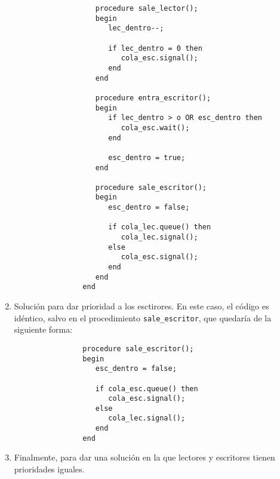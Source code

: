 \begin{ejercicio}
\begin{enumerate}
\begin{verbatim}
                   procedure sale_lector();
                   begin
                      lec_dentro--;

                      if lec_dentro = 0 then
                         cola_esc.signal();
                      end
                   end

                   procedure entra_escritor();
                   begin
                      if lec_dentro > o OR esc_dentro then
                         cola_esc.wait();
                      end

                      esc_dentro = true;
                   end

                   procedure sale_escritor();
                   begin
                      esc_dentro = false;

                      if cola_lec.queue() then
                         cola_lec.signal();
                      else
                         cola_esc.signal();
                      end
                   end
                end
            \end{verbatim}
        \item Solución para dar prioridad a los esctirores. En este caso, el código es idéntico, salvo en el procedimiento \verb|sale_escritor|, que quedaría de la siguiente forma:
            \begin{verbatim}
                procedure sale_escritor();
                begin
                   esc_dentro = false;

                   if cola_esc.queue() then
                      cola_esc.signal();
                   else
                      cola_lec.signal();
                   end
                end
            \end{verbatim}
        \item Finalmente, para dar una solución en la que lectores y escritores tienen prioridades iguales. %
    \end{enumerate}
\end{ejercicio}

